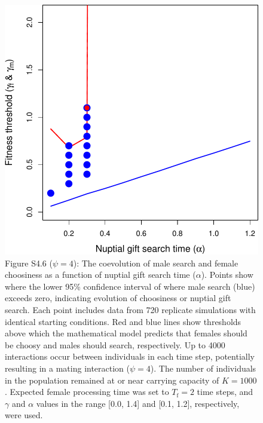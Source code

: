 \documentclass[
]{article}
\begin{document}
\captionsetup{labelformat=empty}

\begin{figure}
\centering
\includegraphics{ms_refs_fixed_files/figure-latex/unnamed-chunk-11-1.pdf}
\caption{Figure S4.6 (\(\psi = 4\)): The coevolution of male search and
female choosiness as a function of nuptial gift search time
(\(\alpha\)). Points show where the lower 95\% confidence interval of
where male search (blue) exceeds zero, indicating evolution of
choosiness or nuptial gift search. Each point includes data from 720
replicate simulations with identical starting conditions. Red and blue
lines show thresholds above which the mathematical model predicts that
females should be choosy and males should search, respectively. Up to
4000 interactions occur between individuals in each time step,
potentially resulting in a mating interaction (\(\psi = 4\)). The number
of individuals in the population remained at or near carrying capacity
of \(K = 1000\). Expected female processing time was set to
\(T_{\mathrm{f}}=2\) time steps, and \(\gamma\) and \(\alpha\) values in
the range {[}0.0, 1.4{]} and {[}0.1, 1.2{]}, respectively, were used.}
\end{figure}

\captionsetup{labelformat=default}

\clearpage

\captionsetup{labelformat=empty}
\end{document}
